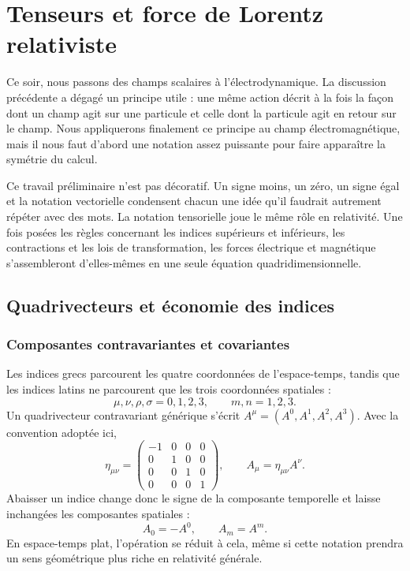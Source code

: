 \chapter{Tenseurs et force de Lorentz relativiste}

Ce soir, nous passons des champs scalaires à l’électrodynamique. La discussion précédente a dégagé un principe utile : une même action décrit à la fois la façon dont un champ agit sur une particule et celle dont la particule agit en retour sur le champ. Nous appliquerons finalement ce principe au champ électromagnétique, mais il nous faut d’abord une notation assez puissante pour faire apparaître la symétrie du calcul.

Ce travail préliminaire n’est pas décoratif. Un signe moins, un zéro, un signe égal et la notation vectorielle condensent chacun une idée qu’il faudrait autrement répéter avec des mots. La notation tensorielle joue le même rôle en relativité. Une fois posées les règles concernant les indices supérieurs et inférieurs, les contractions et les lois de transformation, les forces électrique et magnétique s’assembleront d’elles-mêmes en une seule équation quadridimensionnelle.

\section{Quadrivecteurs et économie des indices}

\subsection{Composantes contravariantes et covariantes}

Les indices grecs parcourent les quatre coordonnées de l’espace-temps, tandis que les indices latins ne parcourent que les trois coordonnées spatiales :
\begin{equation}
\mu,\nu,\rho,\sigma=0,1,2,3,
\qquad
m,n=1,2,3.
\end{equation}
Un quadrivecteur contravariant générique s’écrit \(A^\mu=(A^0,A^1,A^2,A^3)\).
Avec la convention adoptée ici,
\begin{equation}
\eta_{\mu\nu}
=
\begin{pmatrix}
-1&0&0&0\\
0&1&0&0\\
0&0&1&0\\
0&0&0&1
\end{pmatrix},
\qquad
A_\mu=\eta_{\mu\nu}A^\nu .
\label{eq:sr6-metric-lowering}
\end{equation}
Abaisser un indice change donc le signe de la composante temporelle et laisse inchangées les composantes spatiales :
\begin{equation}
A_0=-A^0,
\qquad
A_m=A^m.
\label{eq:sr6-component-lowering}
\end{equation}
En espace-temps plat, l’opération se réduit à cela, même si cette notation prendra un sens géométrique plus riche en relativité générale.

